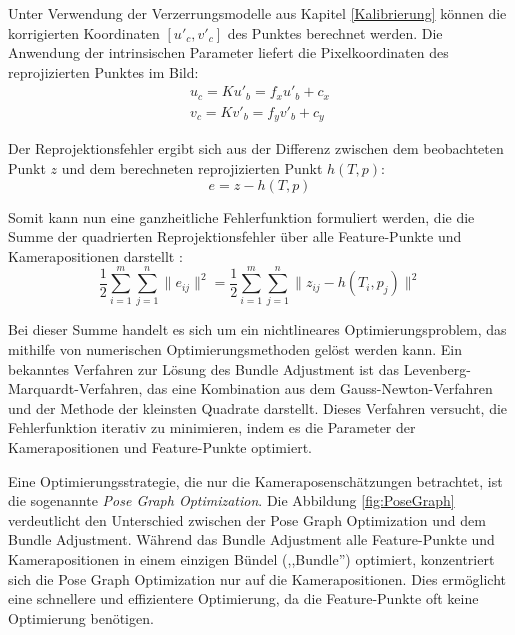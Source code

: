 Unter Verwendung der Verzerrungsmodelle aus Kapitel \ref{Kalibrierung} können die korrigierten Koordinaten \( [u'_c, v'_c] \) des Punktes berechnet werden. Die Anwendung der intrinsischen Parameter liefert die Pixelkoordinaten des reprojizierten Punktes im Bild:
\begin{equation}
    \begin{aligned}
        u_c = Ku'_b = f_xu'_b + c_x \\
        v_c = Kv'_b = f_yv'_b + c_y
    \end{aligned}
\end{equation}

Der Reprojektionsfehler ergibt sich aus der Differenz zwischen dem beobachteten Punkt \( z \) und dem berechneten reprojizierten Punkt \( h(T,p) \):
\begin{equation}
    e = z - h(T,p)
\end{equation}

Somit kann nun eine ganzheitliche Fehlerfunktion formuliert werden, die die Summe der quadrierten Reprojektionsfehler über alle Feature-Punkte und Kamerapositionen darstellt \cite{gao2021vSLAM}:
\begin{equation}
    \frac{1}{2} \sum_{i=1}^{m} \sum_{j=1}^{n} \| e_{ij} \|^2 = \frac{1}{2} \sum_{i=1}^{m} \sum_{j=1}^{n} \| z_{ij} - h(T_i, p_j) \|^2
\end{equation}

Bei dieser Summe handelt es sich um ein nichtlineares Optimierungsproblem, das mithilfe von numerischen Optimierungsmethoden gelöst werden kann. Ein bekanntes Verfahren zur Lösung des Bundle Adjustment ist das Levenberg-Marquardt-Verfahren, das eine Kombination aus dem Gauss-Newton-Verfahren und der Methode der kleinsten Quadrate darstellt. Dieses Verfahren versucht, die Fehlerfunktion iterativ zu minimieren, indem es die Parameter der Kamerapositionen und Feature-Punkte optimiert. \cite{gao2021vSLAM, levenberg2024minimization}

Eine Optimierungsstrategie, die nur die Kameraposenschätzungen betrachtet, ist die sogenannte \emph{Pose Graph Optimization}. Die Abbildung \ref{fig:PoseGraph} verdeutlicht den Unterschied zwischen der Pose Graph Optimization und dem Bundle Adjustment. Während das Bundle Adjustment alle Feature-Punkte und Kamerapositionen in einem einzigen Bündel (,,Bundle'') optimiert, konzentriert sich die Pose Graph Optimization nur auf die Kamerapositionen. Dies ermöglicht eine schnellere und effizientere Optimierung, da die Feature-Punkte oft keine Optimierung benötigen. \cite{gao2021vSLAM}

